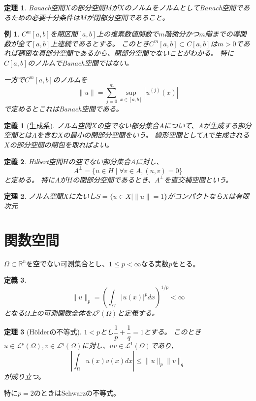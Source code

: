 \documentclass{jsarticle}
\newtheorem{dfn}{定義}
\newtheorem{eg}{例}
\newtheorem{thm}{定理}
\newcommand{\R}{\mathbb{R}}
\newcommand{\abs}[1]{|#1|}
\newcommand{\norm}[1]{\|#1\|}
\begin{document}
\begin{thm}
Banach空間$X$の部分空間$M$が$X$のノルムをノルムとしてBanach空間であるための必要十分条件は$M$が閉部分空間であること。
\end{thm}

\begin{eg}
$C^m[a,b]$を閉区間$[a,b]$上の複素数値関数で$m$階微分かつ$m$階までの導関数が全て$[a,b]$上連続であるとする。
このとき$C^m[a,b]\subset C[a,b]$は$m>0$であれば稠密な真部分空間であるから、閉部分空間でないことがわかる。
特に$C[a,b]$のノルムでBanach空間ではない。

一方で$C^m[a,b]$のノルムを
\[
\norm{u}=\sum^m_{j=0}\sup_{x\in[a,b]}\abs{u^{(j)}(x)}
\]
で定めるとこれはBanach空間である。
\end{eg}

\begin{dfn}[生成系]
ノルム空間$X$の空でない部分集合$A$について、$A$が生成する部分空間とは$A$を含む$X$の最小の閉部分空間をいう。
線形空間として$A$で生成される$X$の部分空間の閉包を取ればよい。
\end{dfn}

\begin{dfn}
Hilbert空間$H$の空でない部分集合$A$に対し、
\[
A^\perp=\{u\in H\mid \forall v\in A, (u,v)=0\}
\]
と定める。
特に$A$が$H$の閉部分空間であるとき、$A^\perp$を直交補空間という。
\end{dfn}

\begin{thm}
ノルム空間$X$にたいし$S=\{u\in X\mid \norm{u}=1\}$がコンパクトなら$X$は有限次元
\end{thm}

\section{関数空間}
$\Omega\subset\R^n$を空でない可測集合とし、$1\leq p<\infty$なる実数$p$をとる。
\begin{dfn}
\[
\norm{u}_p=\left(\int_\Omega\abs{u(x)}^pdx\right)^{1/p}<\infty
\]
となる$\Omega$上の可測関数全体を$\mathcal{L}^p(\Omega)$と定義する。
\end{dfn}

\begin{thm}[H\"olderの不等式]
$1<p$とし$\dfrac{1}{p}+\dfrac{1}{q}=1$とする。
このとき$u\in\mathcal{L}^p(\Omega), v\in\mathcal{L}^q(\Omega)$に対し、$uv\in\mathcal{L}^1(\Omega)$であり、
\[
\abs{\int_\Omega u(x)v(x)dx}\leq\norm{u}_p\norm{v}_q
\]
が成り立つ。
\end{thm}
特に$p=2$のときはSchwarzの不等式。
\end{document}
